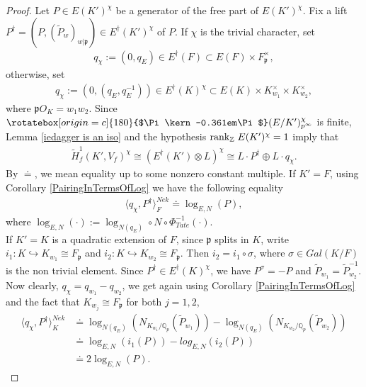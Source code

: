 \documentclass[reqno,10pt]{amsart}
\newcommand{\qp}{\mathbb{Q}_{p}}
\newcommand{\z}{\mathbb{Z}}
\newcommand{\p}{\mathfrak{p}}
\newcommand{\tp}{\widetilde{P}}
\newcommand{\Varpi}{\rotatebox[origin=c]{180}{$\Pi\kern-0.361em\Pi$}}
\theoremstyle{plain}
\theoremstyle{definition}
\begin{document}
\begin{proof}
    Let $P \in E(K')^\chi$ be a generator of the free part of $E(K')^\chi$. Fix a lift $P^\dagger = (P,(\tp_w)_{w|\p}) \in E^\dagger(K')^\chi$ of $P$. If $\chi$ is the trivial character, set
    \begin{align*}
        q_\chi := (0,q_E) \in E^\dagger(F) \subset E(F) \times F_\p^\times,
    \end{align*}
    otherwise, set
    \begin{align*}
        q_\chi := (0,(q_E,q_E^{-1})) \in E^\dagger(K)^\chi \subset E(K) \times K_{w_1}^\times \times K_{w_2}^\times,
    \end{align*}
    where $\p O_K = w_1w_2$. Since $\Varpi(E/K')^{\chi}_{p^\infty}$ is finite, Lemma \ref{iedagger is an iso} and the hypothesis $\mathrm{rank}_\z \hspace{0.01mm} \hspace{1mm} E(K')^\chi = 1$ imply that 
    \begin{align*}
        \widetilde{H}^1_f(K',V_f)^\chi \cong (E^\dagger(K') \otimes L)^\chi \cong L \cdot P^\dagger \oplus L \cdot q_\chi.
    \end{align*}
    By $\doteq$, we mean equality up to some nonzero constant multiple. If $K'=F$, using Corollary \ref{PairingInTermsOfLog} we have the following equality 
    \begin{align*}
        \langle q_\chi,P^\dagger \rangle^{Nek}_F \doteq \log_{E,N}(P),
    \end{align*}
    where $\log_{E,N}(\cdot) := \log_{N(q_E)} \circ N \circ \Phi_{Tate}^{-1}(\cdot)$.
    \\
    If $K' = K$ is a quadratic extension of $F$, since $\p$ splits in $K$, write $i_1 : K \hookrightarrow K_{w_1} \cong F_\p$ and $i_2 : K \hookrightarrow K_{w_2} \cong F_\p$. Then $i_2 = i_1 \circ \sigma$, where $\sigma \in Gal(K/F)$ is the non trivial element. Since $P^\dagger \in E^\dagger(K)^\chi$, we have $P^\sigma = -P$ and $\tp_{w_1} = \tp_{w_2}^{-1}$.
    Now clearly, $q_\chi = q_{w_1}-q_{w_2}$, we get again using Corollary \ref{PairingInTermsOfLog} and the fact that $K_{w_j} \cong F_\p$ for both $j = 1,2$,
    \begin{align*}
        \langle q_\chi, P^\dagger \rangle^{Nek}_K & \doteq \log_{N(q_E)}(N_{K_{w_1}/\qp}(\tp_{w_1})) - \log_{N(q_E)}(N_{K_{w_2}/\qp}(\tp_{w_2})) \\
        & \doteq \log_{E,N}(i_1(P)) - log_{E,N}(i_2(P)) \\
        & \doteq 2 \log_{E,N}(P).
    \end{align*}

\end{proof}
\end{document}
